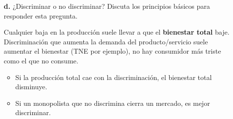 \documentclass{exam}
\begin{document}
\begin{itemize}
\begin{solution}
    \end{solution}
    \item[\textbf{d.}] ¿Discriminar o no discriminar? Discuta los principios básicos para responder esta pregunta.
    \begin{solution}
    Cualquier baja en la producción suele llevar a que el \textbf{bienestar total} baje. Discriminación que aumenta la demanda del producto/servicio suele aumentar el bienestar (TNE por ejemplo), no hay consumidor más triste como el que no consume. 
        \begin{itemize}
            \item Si la producción total cae con la discriminación, el bienestar total disminuye.
            \item Si un monopolista que no discrimina cierra un mercado, es mejor discriminar.
        \end{itemize}
    \end{solution}
    \end{itemize}
\end{document}
